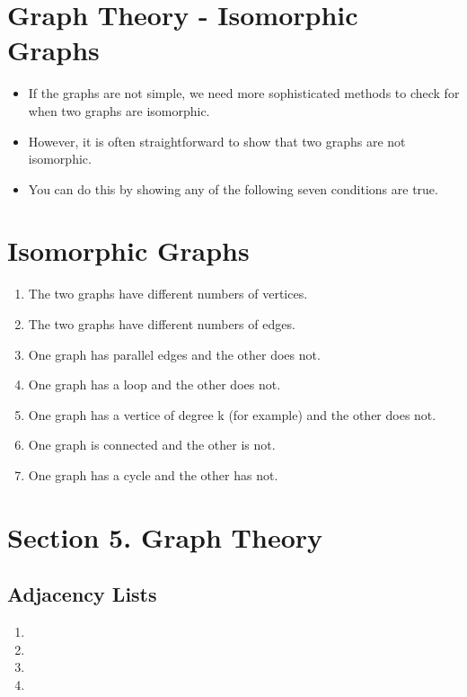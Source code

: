 \documentclass[]{report}
\begin{document}
\section{Graph Theory - Isomorphic Graphs}

\begin{itemize}
\item If the graphs are not simple, we need more sophisticated methods to check for when two graphs are isomorphic. 
\item However, it is often straightforward to show that two graphs are not isomorphic. 
\item You can do this by showing any of the following seven conditions are true.
\end{itemize}


\section{Isomorphic Graphs}

\begin{enumerate}
\item The two graphs have different numbers of vertices.
\item The two graphs have different numbers of edges.
\item One graph has parallel edges and the other does not.
\item One graph has a loop and the other does not.
\item One graph has a vertice of degree k (for example) and the other does not.
\item One graph is connected and the other is not.
\item One graph has a cycle and the other has not.
\end{enumerate}


\section*{Section 5. Graph Theory}

\subsection*{Adjacency Lists}
\begin{enumerate}
\item
\item
\item
\item
\end{enumerate}
\end{document}
